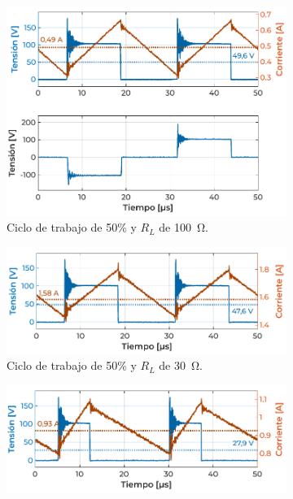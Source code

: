 \begin{figure}[h]
    \centering
    \hspace{0.235\textwidth}
    \begin{subfigure}{0.51\textwidth}
        \centering
        \includegraphics[width=\textwidth]{Imagenes/Con Carga - Caso 7.pdf}
        \caption{Ciclo de trabajo de 50\% y $R_L$ de \SI[]{100}{\ohm}.}
        \label{fig:ensayo_concarga30V_DC50_RL100}
    \end{subfigure}
    \hfill\vspace{1em}
    \begin{subfigure}{0.48\textwidth}
        \centering
        \includegraphics[width=\textwidth]{Imagenes/Con Carga - Caso 9.pdf}
        \caption{Ciclo de trabajo de 50\% y $R_L$ de \SI[]{30}{\ohm}.}
        \label{fig:ensayo_concarga30V_DC50_RL30}
    \end{subfigure}
    \hspace{0.5em}
    \begin{subfigure}{0.48\textwidth}
        \centering
        \includegraphics[width=\textwidth]{Imagenes/Con Carga - Caso 10.pdf}

\end{subfigure}
\end{figure}
